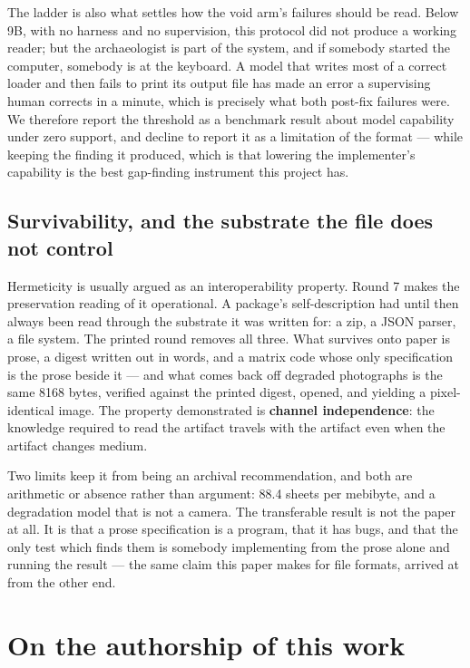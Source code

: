 \documentclass[10pt,twocolumn,letterpaper]{article}
\begin{document}
The ladder is also what settles how the void arm's failures should be read. Below 9B, with no harness and no supervision, this protocol did not produce a working reader; but the archaeologist is part of the system, and if somebody started the computer, somebody is at the keyboard. A model that writes most of a correct loader and then fails to print its output file has made an error a supervising human corrects in a minute, which is precisely what both post-fix failures were. We therefore report the threshold as a benchmark result about model capability under zero support, and decline to report it as a limitation of the format --- while keeping the finding it produced, which is that lowering the implementer's capability is the best gap-finding instrument this project has.

\subsection{Survivability, and the substrate the file does not control}

Hermeticity is usually argued as an interoperability property. Round 7 makes the preservation reading of it operational. A package's self-description had until then always been read through the substrate it was written for: a zip, a JSON parser, a file system. The printed round removes all three. What survives onto paper is prose, a digest written out in words, and a matrix code whose only specification is the prose beside it --- and what comes back off degraded photographs is the same 8168 bytes, verified against the printed digest, opened, and yielding a pixel-identical image. The property demonstrated is \textbf{channel independence}: the knowledge required to read the artifact travels with the artifact even when the artifact changes medium.

Two limits keep it from being an archival recommendation, and both are arithmetic or absence rather than argument: 88.4 sheets per mebibyte, and a degradation model that is not a camera. The transferable result is not the paper at all. It is that a prose specification is a program, that it has bugs, and that the only test which finds them is somebody implementing from the prose alone and running the result --- the same claim this paper makes for file formats, arrived at from the other end.

\section{On the authorship of this work}
\end{document}
